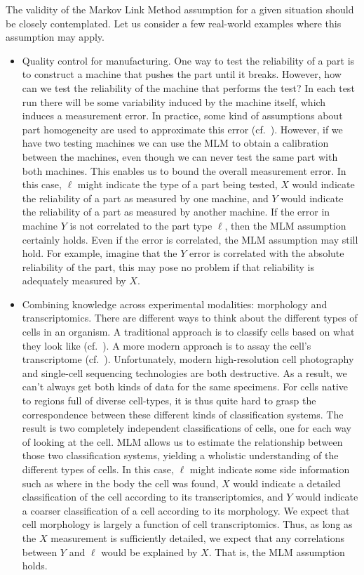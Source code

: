 The validity of the Markov Link Method assumption for a given situation should be closely contemplated.  Let us consider a few real-world examples where this assumption may apply.

\begin{itemize}
    \item Quality control for manufacturing.   One way to test the reliability of a part is to construct a machine that pushes the part until it breaks.  However, how can we test the reliability of the machine that performs the test?  In each test run there will be some variability induced by the machine itself, which induces a measurement error.  In practice, some kind of assumptions about part homogeneity are used to approximate this error (cf.\ \cite{de2005gauge}).  However, if we have two testing machines we can use the MLM to obtain a calibration between the machines, even though we can never test the same part with both machines.  This enables us to bound the overall measurement error.  In this case, $\ell$ might indicate the type of a part being tested, $X$ would indicate the reliability of a part as measured by one machine, and $Y$ would indicate the reliability of a part as measured by another machine.  If the error in machine $Y$ is not correlated to the part type $\ell$, then the MLM assumption certainly holds.  Even if the error is correlated, the MLM assumption may still hold.  For example, imagine that the $Y$ error is correlated with the absolute reliability of the part, this may pose no problem if that reliability is adequately measured by $X$.  

    \item Combining knowledge across experimental modalities: morphology and transcriptomics.  There are different ways to think about the different types of cells in an organism.  A traditional approach is to classify cells based on what they look like (cf.\ \cite{steinman1973identification,bloomfield1982physiological}).  A more modern approach is to assay the cell's transcriptome (cf.\ \citep{tasic2017shared}).  Unfortunately, modern high-resolution cell photography and single-cell sequencing technologies are both destructive.  As a result, we can't always get both kinds of data for the same specimens.  For cells native to regions full of diverse cell-types, it is thus quite hard to grasp the correspondence between these different kinds of classification systems.  The result is two completely independent classifications of cells, one for each way of looking at the cell.  MLM allows us to estimate the relationship between those two classification systems, yielding a wholistic understanding of the different types of cells.  In this case, $\ell$ might indicate some side information such as where in the body the cell was found, $X$ would indicate a detailed classification of the cell according to its transcriptomics, and $Y$ would indicate a coarser classification of a cell according to its morphology.  We expect that cell morphology is largely a function of cell transcriptomics.  Thus, as long as the $X$ measurement is sufficiently detailed, we expect that any correlations between $Y$ and $\ell$ would be explained by $X$.  That is, the MLM assumption holds.  


\end{itemize}

